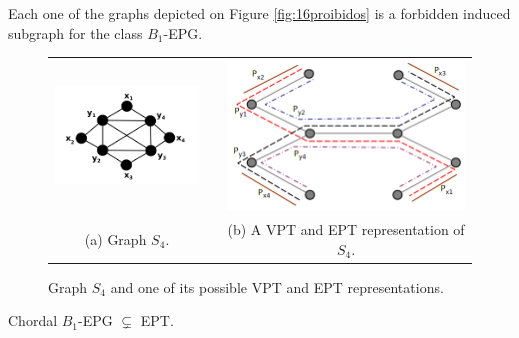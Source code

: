 \documentclass{dmgt}
\begin{document}
  \begin{cor}\label{c:prohib}
  Each one of the graphs depicted on Figure \ref{fig:16proibidos} is a forbidden induced subgraph for the class $B_1$-EPG.
  \end{cor}
  




%
\begin{figure}[h]
  \centering
  \begin{tabular}{ c c c }
    \centering
    \includegraphics[width=5cm]{s4.png} & &
    \includegraphics[width=8cm]{s4eptRepresentation.png}
    \\
    \footnotesize \centering 
    (a)  \footnotesize Graph $S_4$. &&  \footnotesize (b) A VPT and EPT representation of $S_{4}$. \\

  \end{tabular}

 \caption{Graph $S_4$ and one of its possible VPT and EPT representations.}
 \label{fig:exemplos}
\end{figure} 



\begin{theorem}\label{teo:b1epgept}
Chordal $B_1$-EPG $\subsetneq$ EPT. 
\end{theorem}
\end{document}
